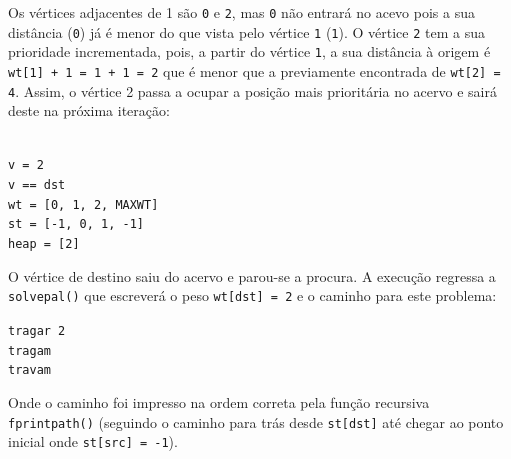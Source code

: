 \documentclass[portuguese, a4paper]{article}
\newcommand\tu[0]{\textunderscore}
\begin{document}
	\par
	Os vértices adjacentes de 1 são \texttt{0} e \texttt{2}, mas \texttt{0} não
	entrará no acevo pois a sua distância (\texttt{0}) já é menor do que vista
	pelo vértice \texttt{1} (\texttt{1}). O vértice \texttt{2} tem a sua
	prioridade incrementada, pois, a partir do vértice \texttt{1}, a sua
	distância à origem é \texttt{wt[1] + 1 = 1 + 1 = 2} que é menor que a
	previamente encontrada de \texttt{wt[2] = 4}. Assim, o vértice 2 passa a
	ocupar a posição mais prioritária no acervo e sairá deste na próxima
	iteração:
	\begin{center}
		\begin{minipage}{0.45\linewidth}
		\texttt{\\
			v = 2 \\
			v == dst \\
			wt = [0, 1, 2, MAX\tu WT] \\
			st = [-1, 0, 1, -1] \\
			heap = [2] \\}
		\end{minipage}
		\hspace{0.05\linewidth}
	\end{center}
	\par
	O vértice de destino saiu do acervo e parou-se a procura. A execução
	regressa a \texttt{solve\tu pal()} que escreverá o peso \texttt{wt[dst] = 2}
	e o caminho para este problema:
	\begin{center}
	\begin{minipage}{0.15\linewidth}
		\texttt{tragar 2 \\
				tragam \\
				travam}
	\end{minipage}
	\end{center}
	\par
	Onde o caminho foi impresso na ordem correta pela função recursiva
	\texttt{fprint\tu path()} (seguindo o caminho para trás desde
	\texttt{st[dst]} até chegar ao ponto inicial onde \texttt{st[src] = -1}).

\end{document}
